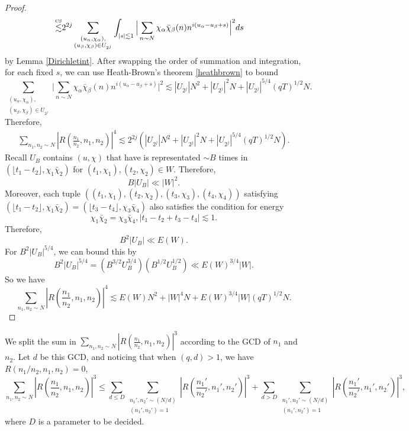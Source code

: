 \begin{proof}
\begin{align*}
 \stackon{CS}{\lesssim}& 2^{2j} \sum_{\substack{(u_{\alpha},\chi_{\alpha}),\\(u_{\beta},\chi_{\beta})\in U_{2^j}}} \int_{|s|\lesssim 1}\Big|\sum_{n\sim N}  \chi_\alpha\bar\chi_\beta(n){n}^{i(u_\alpha - u_\beta + s)}\Big|^2ds
\end{align*}
by Lemma \ref{Dirichletint}.
After swapping the order of summation and integration, for each fixed $s$, we can use Heath-Brown's theorem \ref{heathbrown} to bound \[
    \sum_{\substack{(u_{\alpha},\chi_{\alpha}),\\(u_{\beta},\chi_{\beta})\in U_{2^j}}}\Big|\sum_{n\sim N}  \chi_\alpha\bar\chi_\beta(n){n}^{i(u_\alpha - u_\beta + s)}\Big|^2
    \lesssim |U_{2^j}|N^2+ |U_{2^j}|^2N + |U_{2^j}|^{5/4}(qT)^{1/2}N.
\] 
Therefore, \begin{align*}
    \sum_{n_1,n_2\sim N} \left|R\left(\frac{n_1}{n_2} ,n_1,n_2\right) \right|^4 \lesssim 2^{2j}(|U_{2^j}|N^2+ |U_{2^j}|^2N + |U_{2^j}|^{5/4}(qT)^{1/2}N).
\end{align*}
Recall $U_B$ contains $(u,\chi)$ that have is representated $\sim B$ times in $(\lfloor t_1-t_2\rfloor, \chi_1\bar\chi_2)$ for $(t_1,\chi_1),(t_2,\chi_2)\in W$.
Therefore, \[
B|U_B|\ll |W|^2.
\] 
Moreover, each tuple $((t_1,\chi_1),(t_2,\chi_2),(t_3,\chi_3),(t_4,\chi_4))$ satisfying $(\lfloor t_1-t_2\rfloor, \chi_1\bar\chi_2)=(\lfloor t_3-t_4\rfloor, \chi_3\bar\chi_4)$ also satisfies the condition for energy \[
    \chi_1\bar\chi_2=\chi_3\bar\chi_4, |t_1-t_2+t_3-t_4|\lesssim 1.
\]
Therefore, \[
    B^2|U_B|\ll E(W).
\]
For $B^2|U_B|^{5/4}$, we can bound this by \[
B^2|U_B|^{5/4} = (B^{3/2}U_B^{3/4})(B^{1/2}U_B^{1/2})\ll E(W)^{3/4}|W|.
\]
So we have \[
    \sum_{n_1,n_2\sim N} \left|R\left(\frac{n_1}{n_2} ,n_1,n_2\right) \right|^4 \lesssim E(W)N^2+ |W|^4N +  E(W)^{3/4}|W|(qT)^{1/2}N.
\]

\end{proof}


We split the sum in $\sum_{n_1,n_2\sim N}  \left|R\left(\frac{n_1}{n_2} ,n_1,n_2\right) \right|^3$ according to the GCD of $n_1$ and $n_2$. Let $d$ be this GCD, and noticing that when $(q,d)>1$,  we have $R\left(n_1/n_2 ,n_1,n_2\right)=0$,\[
    \sum_{n_1,n_2\sim N}  \left|R\left(\frac{n_1}{n_2} ,n_1,n_2\right) \right|^3\leq \sum_{d\leq D}\sum_{\substack{n_1',n_2'\sim (N/d)\\(n_1',n_2')=1}}  \left|R\left(\frac{n_1'}{n_2'} ,n_1',n_2'\right) \right|^3+\sum_{d> D}\sum_{\substack{n_1',n_2'\sim (N/d)\\(n_1',n_2')=1}}  \left|R\left(\frac{n_1'}{n_2'} ,n_1',n_2'\right) \right|^3,
\]
where $D$ is a parameter to be decided.

